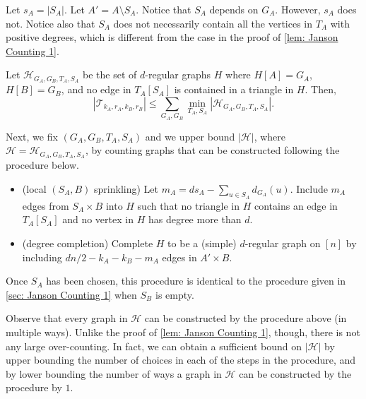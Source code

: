 \documentclass[11pt]{article}
\theoremstyle{plain}
\begin{document}
Let $s_A=|S_A|$. Let $A' = A \setminus S_A$. Notice that $S_A$ depends on $G_A$.  However, $s_A$ does not. 
Notice also that $S_A$ does not necessarily contain all the vertices in $T_A$ with positive degrees, which is different from the case in the proof of \cref{lem: Janson Counting 1}.

Let $\mathcal H_{G_A, G_B, T_A, S_A}$ be the set of $d$-regular graphs $H$ where $H[A] = G_A$, $H[B] = G_B$, and no edge in $T_A[S_A]$  is contained in a triangle in $H$. Then,
\begin{equation}
|\mathcal T_{k_A, r_A, k_B, r_B}|\le \sum_{G_A,G_B} \min_{T_A, S_A}|{\mathcal H}_{G_A,G_B,T_A,S_A}|.\label{eq:insideGAGB2}
\end{equation}

Next, we fix $(G_A,G_B,T_A,S_A)$ and we upper bound $|\mathcal H|$, where ${\mathcal H}={\mathcal H}_{G_A,G_B,T_A,S_A}$,
by counting graphs that can be constructed following the procedure below. 

    \begin{itemize}
        \item[1.](local $(S_A, B)$ sprinkling) Let $m_A = ds_A  - \sum_{u \in S_A}d_{G_A}(u)$. Include $m_A$ edges from $S_A \times B$ into $H$ such that no triangle in $H$ contains an edge in $T_A[S_A]$ and no vertex in $H$ has degree more than $d$.
        \item[2.](degree completion) Complete $H$ to be a (simple) $d$-regular graph on $[n]$ by including $dn/2 - k_A - k_B - m_A$ edges in $A'\times B$.
    \end{itemize}

    Once $S_A$ has been chosen, this procedure is identical to the procedure given in \cref{sec: Janson Counting 1} when $S_B$ is empty.
    
    Observe that every graph in ${\mathcal H}$ can be constructed by the procedure above (in multiple ways). Unlike the proof of \cref{lem: Janson Counting 1}, though, there is not any large over-counting. In fact, we can obtain a sufficient bound on $|{\mathcal H}|$ by upper bounding the number of choices in each of the steps in the procedure, and by lower bounding the number of ways a graph in ${\mathcal H}$ can be constructed by the procedure by $1$.
\end{document}
